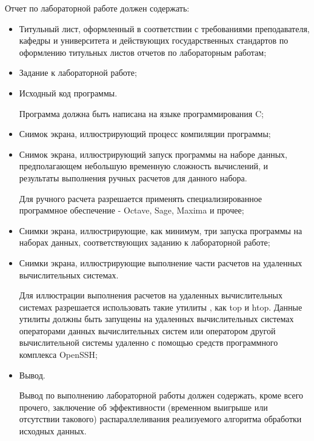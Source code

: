 
Отчет по лабораторной работе должен содержать:

\begin{itemize}

	\item Титульный лист, оформленный в соответствии с требованиями преподавателя, кафедры и университета и действующих государственных стандартов по оформлению титульных листов отчетов по лабораторным работам;
	
	\item Задание к лабораторной работе;

	\item Исходный код программы.

	Программа должна быть написана на языке программирования C;

	\item Снимок экрана, иллюстрирующий процесс компиляции программы;

	\item Снимок экрана, иллюстрирующий запуск программы на наборе данных, предполагающем небольшую временную сложность вычислений, и результаты выполнения ручных расчетов для данного набора.

	Для ручного расчета разрешается применять специализированное программное обеспечение - Octave, Sage, Maxima и прочее;

	\item Снимки экрана, иллюстрирующие, как минимум, три запуска программы на наборах данных, соответствующих заданию к лабораторной работе;

	\item Снимки экрана, иллюстрирующие выполнение части расчетов на удаленных вычислительных системах.

	Для иллюстрации выполнения расчетов на удаленных вычислительных системах разрешается использовать такие утилиты \gl, как top и htop. Данные утилиты должны быть запущены на удаленных вычислительных системах операторами данных вычислительных систем или оператором другой вычислительной системы удаленно с помощью средств программного комплекса OpenSSH;

	\item Вывод.

	Вывод по выполнению лабораторной работы должен содержать, кроме всего прочего, заключение об эффективности (временном выигрыше или отсутствии такового) распараллеливания реализуемого алгоритма обработки исходных данных.

\end{itemize}

